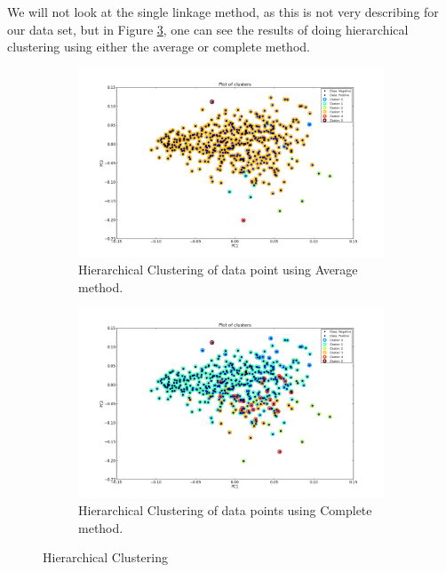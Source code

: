 We will not look at the single linkage method, as this is not very describing for our data set, but in Figure \ref{HCResults}, one can see the results of doing hierarchical clustering using either the average or complete method.

\begin{figure}[H]
\begin{subfigure}[b]{1\textwidth}
\includegraphics[scale=0.5]{pictures/HCAvg.png}
\caption{\footnotesize Hierarchical Clustering of data point using Average method.}
\label{HCResultsAVG}
\end{subfigure}
\begin{subfigure}[b]{1\textwidth}
\includegraphics[scale=0.5]{pictures/HCCom.png}
\caption{\footnotesize Hierarchical Clustering of data points using Complete method.}
\label{HCResultsCOM}
\end{subfigure}
\caption{\footnotesize Hierarchical Clustering}
\label{HCResults}
\end{figure}

